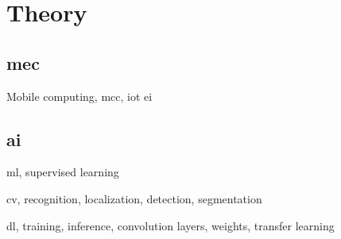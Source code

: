 \chapter{Theory}

\section{\gls{mec}}

Mobile computing, \gls{mcc}, \gls{iot} \gls{ei}

\section{\gls{ai}}

\gls{ml}, supervised learning

\gls{cv}, recognition, localization, detection, segmentation

\gls{dl}, training, inference, convolution layers, weights, transfer learning 

